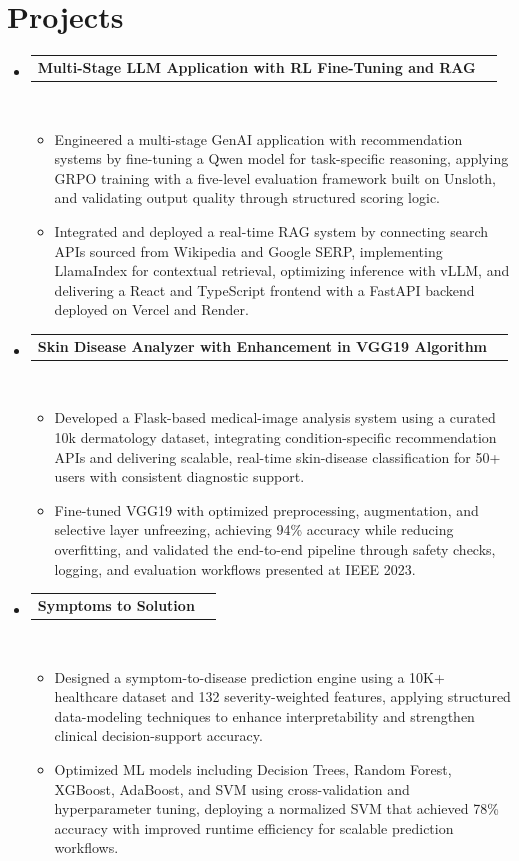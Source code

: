 \documentclass[letterpaper,11pt]{article}
\newcommand{\resumeItem}[1]{\item\small{{#1 \vspace{-3pt}}}}
\newcommand{\resumeProjectHeading}[2]{ 
    \vspace{-3pt}\item 
    \begin{tabularx}{0.995\textwidth}[t]{Xr} 
      \small\textbf{#1} & #2 \\ 
    \end{tabularx}\\[-3pt] 
    \vspace{3pt} 
}
\newcommand{\resumeItemListStart}{\begin{itemize}}
\newcommand{\resumeItemListEnd}{\end{itemize}\vspace{-4pt}}
\newcommand{\resumeSubHeadingListStart}{
  \begin{itemize}[leftmargin=0.12in, label={}]
  \setlength{\itemsep}{0pt}
  \setlength{\parsep}{0pt}
  \setlength{\parskip}{0pt}
}
\newcommand{\resumeSubHeadingListEnd}{\end{itemize}}
\begin{document}
\section{Projects}
\vspace{-4pt}
\resumeSubHeadingListStart

\resumeProjectHeading
{Multi-Stage LLM Application with RL Fine-Tuning and RAG}{}
\resumeItemListStart
\resumeItem{Engineered a multi-stage GenAI application with recommendation systems by fine-tuning a Qwen model for task-specific reasoning, applying GRPO training with a five-level evaluation framework built on Unsloth, and validating output quality through structured scoring logic.}
\resumeItem{Integrated and deployed a real-time RAG system by connecting search APIs sourced from Wikipedia and Google SERP, implementing LlamaIndex for contextual retrieval, optimizing inference with vLLM, and delivering a React and TypeScript frontend with a FastAPI backend deployed on Vercel and Render.}
\resumeItemListEnd

\resumeProjectHeading
{Skin Disease Analyzer with Enhancement in VGG19 Algorithm}{}
\resumeItemListStart
\resumeItem{Developed a Flask-based medical-image analysis system using a curated 10k dermatology dataset, integrating condition-specific recommendation APIs and delivering scalable, real-time skin-disease classification for 50+ users with consistent diagnostic support.}
\resumeItem{Fine-tuned VGG19 with optimized preprocessing, augmentation, and selective layer unfreezing, achieving 94\% accuracy while reducing overfitting, and validated the end-to-end pipeline through safety checks, logging, and evaluation workflows presented at IEEE 2023.}
\resumeItemListEnd

\resumeProjectHeading
{Symptoms to Solution}{}
\resumeItemListStart
\resumeItem{Designed a symptom-to-disease prediction engine using a 10K+ healthcare dataset and 132 severity-weighted features, applying structured data-modeling techniques to enhance interpretability and strengthen clinical decision-support accuracy.}
\resumeItem{Optimized ML models including Decision Trees, Random Forest, XGBoost, AdaBoost, and SVM using cross-validation and hyperparameter tuning, deploying a normalized SVM that achieved 78\% accuracy with improved runtime efficiency for scalable prediction workflows.}
\resumeItemListEnd

\resumeSubHeadingListEnd
\end{document}
